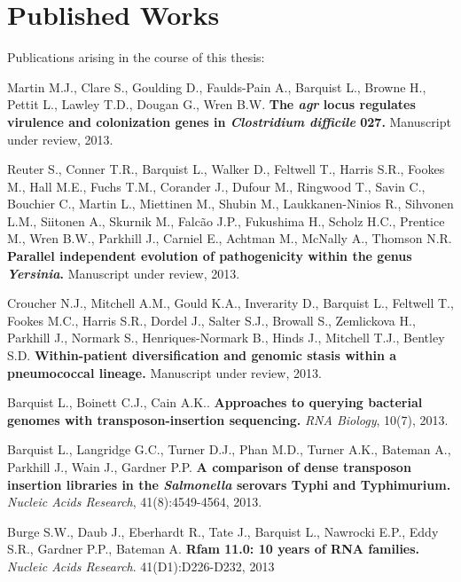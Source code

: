 \chapter{Published Works}

Publications arising in the course of this thesis:

\itemize

\item{Martin M.J., Clare S., Goulding D., Faulds-Pain A., Barquist L., Browne H., Pettit L., Lawley T.D., Dougan G., Wren B.W. \textbf{The \textit{agr} locus regulates virulence and colonization genes in \textit{Clostridium difficile} 027.} Manuscript under review, 2013. }

\item{Reuter S., Conner T.R., Barquist L., Walker D., Feltwell T., Harris S.R., Fookes M., Hall M.E., Fuchs T.M., Corander J., Dufour M., Ringwood T., Savin C., Bouchier C., Martin L., Miettinen M., Shubin M., Laukkanen-Ninios R., Sihvonen L.M., Siitonen A., Skurnik M., Falc\~{a}o J.P., Fukushima H., Scholz H.C., Prentice M., Wren B.W., Parkhill J., Carniel E., Achtman M., McNally A., Thomson N.R. \textbf{Parallel independent evolution of pathogenicity within the genus \textit{Yersinia}.} Manuscript under review, 2013.}

\item{Croucher N.J., Mitchell A.M., Gould K.A., Inverarity D., Barquist L., Feltwell T., Fookes M.C., Harris S.R., Dordel J., Salter S.J., Browall S., Zemlickova H., Parkhill J., Normark S., Henriques-Normark B., Hinds J., Mitchell T.J., Bentley S.D. \textbf{Within-patient diversification and genomic stasis within a pneumococcal lineage.} Manuscript under review, 2013.} 

\item{Barquist L., Boinett C.J., Cain A.K..  \textbf{Approaches to querying bacterial genomes with transposon-insertion sequencing.} \textit{RNA Biology}, 10(7), 2013.}

\newpage

\item{Barquist L., Langridge G.C., Turner D.J., Phan M.D., Turner A.K., Bateman A., Parkhill J., Wain J., Gardner P.P. \textbf{A comparison of dense transposon insertion libraries in the \textit{Salmonella} serovars Typhi and Typhimurium.} \textit{Nucleic Acids Research}, 41(8):4549-4564, 2013.} 

\item{Burge S.W., Daub J., Eberhardt R., Tate J., Barquist L., Nawrocki E.P., Eddy S.R., Gardner P.P., Bateman A. \textbf{Rfam 11.0: 10 years of RNA families.} \textit{Nucleic Acids Research}. 41(D1):D226-D232, 2013}

